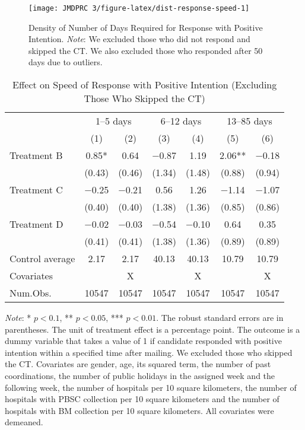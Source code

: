 \documentclass[12pt, a4paper]{article}
\begin{document}
\begin{figure}[H]
\texttt{[image: JMDPRC~3/figure-latex/dist-response-speed-1]} \caption{Density of Number of Days Required for Response with Positive Intention. \newline \emph{Note}: We excluded those who did not respond and skipped the CT. We also excluded those who responded after 50 days due to outliers.}\label{fig:dist-response-speed}
\end{figure}

\begin{table}[H]

\caption{\label{tab:lm-positive-time-decompose-noskip}Effect on Speed of Response with Positive Intention (Excluding Those Who Skipped the CT)}
\centering
\fontsize{8}{10}\selectfont
\begin{threeparttable}
\begin{tabular}[t]{lcccccc}
\toprule
\multicolumn{1}{c}{ } & \multicolumn{2}{c}{1--5 days} & \multicolumn{2}{c}{6--12 days} & \multicolumn{2}{c}{13--85 days} \\
\cmidrule(l{3pt}r{3pt}){2-3} \cmidrule(l{3pt}r{3pt}){4-5} \cmidrule(l{3pt}r{3pt}){6-7}
  & (1) & (2) & (3) & (4) & (5) & (6)\\
\midrule
Treatment B & \num{0.85}* & \num{0.64} & \num{-0.87} & \num{1.19} & \num{2.06}** & \num{-0.18}\\
 & (\num{0.43}) & (\num{0.46}) & (\num{1.34}) & (\num{1.48}) & (\num{0.88}) & (\num{0.94})\\
Treatment C & \num{-0.25} & \num{-0.21} & \num{0.56} & \num{1.26} & \num{-1.14} & \num{-1.07}\\
 & (\num{0.40}) & (\num{0.40}) & (\num{1.38}) & (\num{1.36}) & (\num{0.85}) & (\num{0.86})\\
Treatment D & \num{-0.02} & \num{-0.03} & \num{-0.54} & \num{-0.10} & \num{0.64} & \num{0.35}\\
 & (\num{0.41}) & (\num{0.41}) & (\num{1.38}) & (\num{1.36}) & (\num{0.89}) & (\num{0.89})\\
\midrule
Control average & 2.17 & 2.17 & 40.13 & 40.13 & 10.79 & 10.79\\
Covariates &  & X &  & X &  & X\\
Num.Obs. & \num{10547} & \num{10547} & \num{10547} & \num{10547} & \num{10547} & \num{10547}\\
\bottomrule
\end{tabular}
\begin{tablenotes}
\item \emph{Note}: * $p < 0.1$, ** $p < 0.05$, *** $p < 0.01$. The robust standard errors are in parentheses. The unit of treatment effect is a percentage point. The outcome is a dummy variable that takes a value of 1 if candidate responded with positive intention within a specified time after mailing. We excluded those who skipped the CT. Covariates are gender, age, its squared term, the number of past coordinations, the number of public holidays in the assigned week and the following week, the number of hospitals per 10 square kilometers, the number of hospitals with PBSC collection per 10 square kilometers and the number of hospitals with BM collection per 10 square kilometers. All covariates were demeaned.

\end{tablenotes}
\end{threeparttable}
\end{table}
\end{document}
